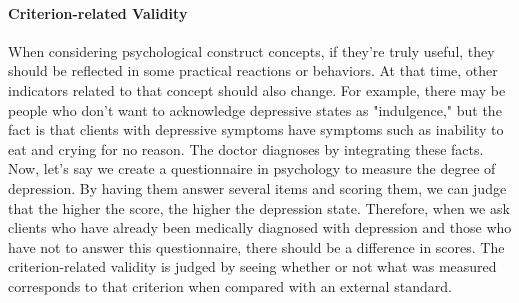 \documentclass{ltjbook}
\begin{document}
\paragraph{Criterion-related Validity} When considering psychological construct concepts, if they're truly useful, they should be reflected in some practical reactions or behaviors. At that time, other indicators related to that concept should also change. For example, there may be people who don't want to acknowledge depressive states as "indulgence," but the fact is that clients with depressive symptoms have symptoms such as inability to eat and crying for no reason. The doctor diagnoses by integrating these facts. Now, let's say we create a questionnaire in psychology to measure the degree of depression. By having them answer several items and scoring them, we can judge that the higher the score, the higher the depression state. Therefore, when we ask clients who have already been medically diagnosed with depression and those who have not to answer this questionnaire, there should be a difference in scores. The criterion-related validity is judged by seeing whether or not what was measured corresponds to that criterion when compared with an external standard.
\end{document}
